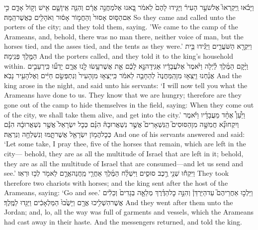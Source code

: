 {וַיָּבֹ֗אוּ וַֽיִּקְרְאוּ֮ אֶל\maqqaf שֹׁעֵ֣ר הָעִיר֒ וַיַּגִּ֤ידוּ לָהֶם֙ לֵאמֹ֔ר בָּ֚אנוּ אֶל\maqqaf מַחֲנֵ֣ה אֲרָ֔ם וְהִנֵּ֧ה אֵֽין\maqqaf שָׁ֛ם אִ֖ישׁ וְק֣וֹל אָדָ֑ם כִּ֣י אִם\maqqaf הַסּ֤וּס אָסוּר֙ וְהַחֲמ֣וֹר אָס֔וּר וְאֹהָלִ֖ים כַּאֲשֶׁר\maqqaf הֵֽמָּה׃}
{So they came and called unto the porters of the city; and they told them, saying. 'We came to the camp of the Arameans, and, behold, there was no man there, neither voice of man, but the horses tied, and the asses tied, and the tents as they were.’}
{וַיִּקְרָ֖א הַשֹּׁעֲרִ֑ים וַיַּגִּ֕ידוּ בֵּ֥ית הַמֶּ֖לֶךְ פְּנִֽימָה׃}
{And the porters called, and they told it to the king’s household within.}
{וַיָּ֨קׇם הַמֶּ֜לֶךְ לַ֗יְלָה וַיֹּ֙אמֶר֙ אֶל\maqqaf עֲבָדָ֔יו אַגִּֽידָה\maqqaf נָּ֣א לָכֶ֔ם אֵ֛ת אֲשֶׁר\maqqaf עָ֥שׂוּ לָ֖נוּ אֲרָ֑ם יָדְע֞וּ כִּֽי\maqqaf רְעֵבִ֣ים אֲנַ֗חְנוּ וַיֵּֽצְא֤וּ מִן\maqqaf הַֽמַּחֲנֶה֙ לְהֵחָבֵ֤ה  לֵאמֹ֔ר כִּֽי\maqqaf יֵצְא֤וּ מִן\maqqaf הָעִיר֙ וְנִתְפְּשֵׂ֣ם חַיִּ֔ים וְאֶל\maqqaf הָעִ֖יר נָבֹֽא׃}
{And the king arose in the night, and said unto his servants: ‘I will now tell you what the Arameans have done to us. They know that we are hungry; therefore are they gone out of the camp to hide themselves in the field, saying: When they come out of the city, we shall take them alive, and get into the city.’}
{וַיַּ֩עַן֩ אֶחָ֨ד מֵעֲבָדָ֜יו וַיֹּ֗אמֶר וְיִקְחוּ\maqqaf נָ֞א חֲמִשָּׁ֣ה מִן\maqqaf הַסּוּסִים֮ הַֽנִּשְׁאָרִים֮ אֲשֶׁ֣ר נִשְׁאֲרוּ\maqqaf בָהּ֒ הִנָּ֗ם כְּכׇל\maqqaf {} יִשְׂרָאֵל֙ אֲשֶׁ֣ר נִשְׁאֲרוּ\maqqaf בָ֔הּ הִנָּ֕ם כְּכׇל\maqqaf הֲמ֥וֹן יִשְׂרָאֵ֖ל אֲשֶׁר\maqqaf תָּ֑מּוּ וְנִשְׁלְחָ֖ה וְנִרְאֶֽה׃}
{And one of his servants answered and said: ‘Let some take, I pray thee, five of the horses that remain, which are left in the city— behold, they are as all the multitude of Israel that are left in it; behold, they are as all the multitude of Israel that are consumed—and let us send and see.’}
{וַיִּקְח֕וּ שְׁנֵ֖י רֶ֣כֶב סוּסִ֑ים וַיִּשְׁלַ֨ח הַמֶּ֜לֶךְ אַחֲרֵ֧י מַֽחֲנֵה\maqqaf אֲרָ֛ם לֵאמֹ֖ר לְכ֥וּ וּרְאֽוּ׃}
{They took therefore two chariots with horses; and the king sent after the host of the Arameans, saying: ‘Go and see.’}
{וַיֵּלְכ֣וּ אַחֲרֵיהֶם֮ עַד\maqqaf הַיַּרְדֵּן֒ וְהִנֵּ֣ה כׇל\maqqaf הַדֶּ֗רֶךְ מְלֵאָ֤ה בְגָדִים֙ וְכֵלִ֔ים אֲשֶׁר\maqqaf הִשְׁלִ֥יכוּ אֲרָ֖ם  וַיָּשֻׁ֙בוּ֙ הַמַּלְאָכִ֔ים וַיַּגִּ֖דוּ לַמֶּֽלֶךְ׃}
{And they went after them unto the Jordan; and, lo, all the way was full of garments and vessels, which the Arameans had cast away in their haste. And the messengers returned, and told the king.}
